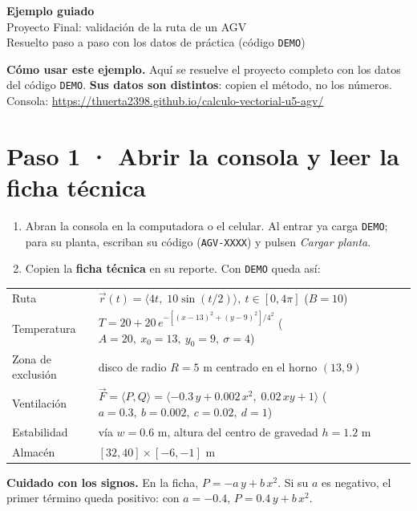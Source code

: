 \documentclass[11pt,letterpaper]{article}
\newcommand{\aviso}[1]{\par\smallskip\colorbox{softorange}{\parbox{\dimexpr\linewidth-2\fboxsep}{\small #1}}\par\smallskip}
\begin{document}
\begin{center}
{\LARGE\bfseries\color{tecnmblue} Ejemplo guiado}\\[3pt]
{\large Proyecto Final: validación de la ruta de un AGV}\\[3pt]
{\normalsize Resuelto paso a paso con los datos de práctica (código \texttt{DEMO})}
\end{center}

\aviso{\textbf{Cómo usar este ejemplo.} Aquí se resuelve el proyecto completo con los datos del código \texttt{DEMO}. \textbf{Sus datos son distintos}: copien el método, no los números. Consola: \url{https://thuerta2398.github.io/calculo-vectorial-u5-agv/}}

\section{Paso 1 · Abrir la consola y leer la ficha técnica}
\begin{enumerate}
\item Abran la consola en la computadora o el celular. Al entrar ya carga \texttt{DEMO}; para su planta, escriban su código (\texttt{AGV-XXXX}) y pulsen \emph{Cargar planta}.
\item Copien la \textbf{ficha técnica} en su reporte. Con \texttt{DEMO} queda así:
\end{enumerate}

\begin{center}\small
\begin{tabularx}{0.95\linewidth}{@{}l Y@{}}
\toprule
Ruta & \(\vec r(t)=\langle 4t,\;10\sin(t/2)\rangle,\ t\in[0,4\pi]\) \quad (\(B=10\)) \\
Temperatura & \(T=20+20\,e^{-[(x-13)^2+(y-9)^2]/4^2}\) \quad (\(A=20,\ x_0=13,\ y_0=9,\ \sigma=4\)) \\
Zona de exclusión & disco de radio \(R=5\) m centrado en el horno \((13,9)\) \\
Ventilación & \(\vec F=\langle P,Q\rangle=\langle -0.3\,y+0.002\,x^2,\; 0.02\,xy+1\rangle\) \quad (\(a=0.3,\ b=0.002,\ c=0.02,\ d=1\)) \\
Estabilidad & vía \(w=0.6\) m, altura del centro de gravedad \(h=1.2\) m \\
Almacén & \([32,40]\times[-6,-1]\) m \\ \bottomrule
\end{tabularx}
\end{center}

\aviso{\textbf{Cuidado con los signos.} En la ficha, \(P=-a\,y+b\,x^2\). Si su \(a\) es negativo, el primer término queda positivo: con \(a=-0.4\), \(P=0.4\,y+b\,x^2\).}
\end{document}
